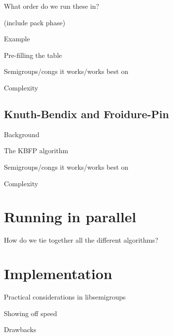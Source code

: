What order do we run these in?

(include pack phase)

Example

Pre-filling the table

Semigroups/congs it works/works best on

Complexity

\subsection{Knuth-Bendix and Froidure-Pin}
\label{sec:kbfp}

Background

The KBFP algorithm

Semigroups/congs it works/works best on

Complexity

\section{Running in parallel}

How do we tie together all the different algorithms?

\section{Implementation}

Practical considerations in libsemigroups

Showing off speed

Drawbacks
